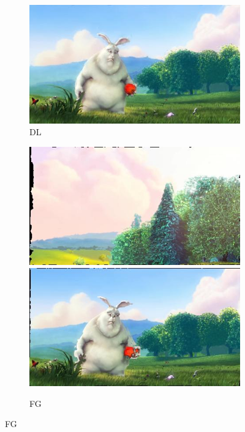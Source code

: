 \begin{figure}
\begin{subfigure}[t]{0.135\textwidth}
		\includegraphics[width=\textwidth]{figures/stereo/bbb_frame-0092-8}
		\caption{DL}
	\end{subfigure}
	\begin{subfigure}[t]{0.135\textwidth}
		\includegraphics[width=\textwidth]{figures/stereo/bbb_frame-0004-11}\\
		\includegraphics[width=\textwidth]{figures/stereo/bbb_frame-0092-11}
		\caption{FG}
	\end{subfigure}

\end{figure}
